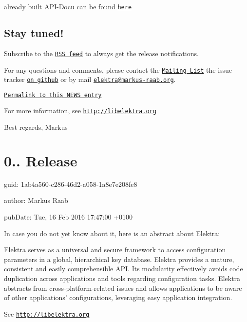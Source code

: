 already built A\+P\+I-\/\+Docu can be found \href{http://doc.libelektra.org/api/0.8.16/html/}{\tt here}

\subsection*{Stay tuned!}

Subscribe to the \href{http://doc.libelektra.org/news/feed.rss}{\tt R\+S\+S feed} to always get the release notifications.

For any questions and comments, please contact the \href{https://lists.sourceforge.net/lists/listinfo/registry-list}{\tt Mailing List} the issue tracker \href{http://git.libelektra.org/issues}{\tt on github} or by mail \href{mailto:elektra@markus-raab.org}{\tt elektra@markus-\/raab.\+org}.

\href{http://doc.libelektra.org/news/9c9247ee-ee9c-4f4a-a68e-76959def9b82.html}{\tt Permalink to this N\+E\+W\+S entry}

For more information, see \href{http://libelektra.org}{\tt http\+://libelektra.\+org}

Best regards, Markus

\section*{0.. Release}


\begin{DoxyItemize}
\item guid\+: 1ab4a560-\/c286-\/46d2-\/a058-\/1a8e7e208fe8
\item author\+: Markus Raab
\item pub\+Date\+: Tue, 16 Feb 2016 17\+:47\+:00 +0100
\end{DoxyItemize}

In case you do not yet know about it, here is an abstract about Elektra\+:

Elektra serves as a universal and secure framework to access configuration parameters in a global, hierarchical key database. Elektra provides a mature, consistent and easily comprehensible A\+P\+I. Its modularity effectively avoids code duplication across applications and tools regarding configuration tasks. Elektra abstracts from cross-\/platform-\/related issues and allows applications to be aware of other applications' configurations, leveraging easy application integration.

See \href{http://libelektra.org}{\tt http\+://libelektra.\+org}

